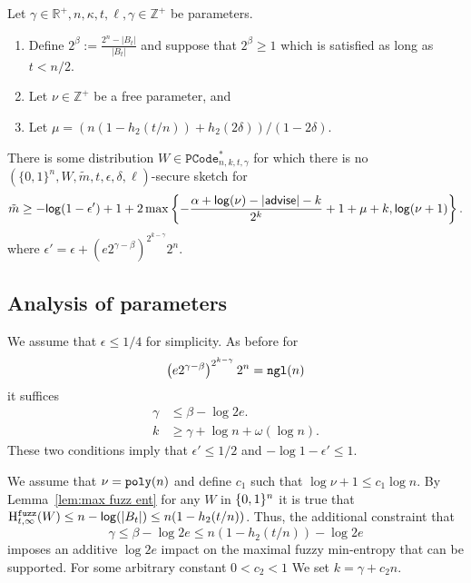 \begin{theorem}
Let $\gamma \in\mathbb{R}^+, n, \kappa, t, \ell, \gamma \in\mathbb{Z}^+$ be parameters.
\begin{enumerate}
\itemsep0em
\item Define $2^\beta:=\frac{2^n-|B_t|}{|B_t|}$ and suppose that $2^\beta\ge 1$ which is satisfied as long as $t< n/2 $. 
\item Let $\nu \in \mathbb{Z}^+$ be a free parameter, and
\item Let $\mu =(n(1-h_2(t/n)) +h_2(2\delta))/(1-2\delta)$.
\end{enumerate}
There is some distribution $W\in \mathtt{PCode}_{n, k, t, \gamma}^{*}$ for which there is no $(\{0,1\}^n, W, \tilde{m}, t, \epsilon,\delta, \ell)$-secure sketch for 
\[
\tilde{m}\ge  -\mathsf{log}\!\left(1-\epsilon'\right) +1 + 2\max\left\{-\frac{\alpha+\mathsf{log}\!\left(\nu\right)-|{\mathsf{advise}}|-k}{2^k}+1+\mu+k, \mathsf{log}\!\left(\nu+1\right)\right\}.
\]
where $\epsilon' = \epsilon+\left(e2^{\gamma-\beta}\right)^{2^{k-\gamma}}2^n.$
\label{thm:main theorem ss}
\end{theorem}

\subsection{Analysis of parameters}
We assume that $\epsilon\le 1/4$ for simplicity.  As before for  
\[
\left(e2^{\gamma-\beta}\right)^{2^{k-\gamma}}2^n = \mathtt{ngl}(n)\]  it suffices 
\begin{align*}
 \gamma &\le \beta -\log{2e}.\\
k &\ge \gamma + \log{n+ \omega(\log{n})}.
\end{align*}
These two conditions imply that $\epsilon'\le 1/2$ and $-\log{1-\epsilon'}\le 1$.

We assume that $\nu = \mathtt{poly}(n)$ and define $c_1$ such that  $\log{\nu+1} \le c_1\log{n}$.
By Lemma~\ref{lem:max fuzz ent} for any $W$ in $\{0, 1\}^n$ it is true that $\mathrm{H}^{\mathtt{fuzz}}_{t,\infty}(W) \le n -\mathsf{log}\!\left(|B_t|\right) \le n(1-h_2(t/n))$.  Thus, the additional constraint that 
\[
\gamma \le \beta - \log{2e}
\le n(1-h_2(t/n)) - \log{2e}\] imposes an additive $\log{2e}$ impact on the maximal fuzzy min-entropy that can be supported. 
For some arbitrary constant $0<c_2 < 1$ We set $k = \gamma + c_2n$. 

